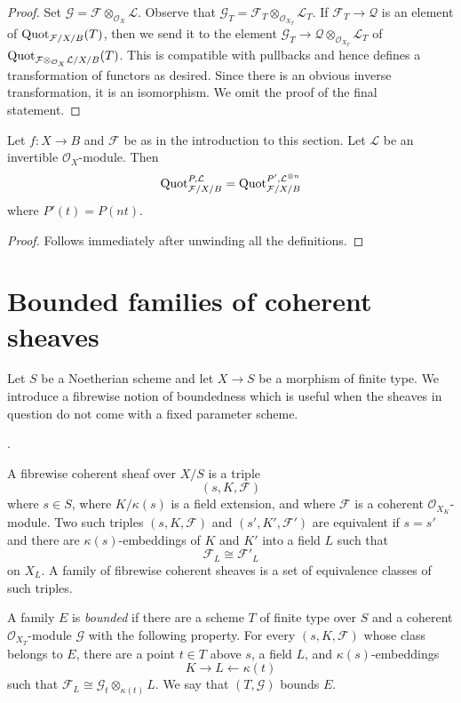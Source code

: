 \begin{proof}
Set $\mathcal{G} = \mathcal{F} \otimes_{\mathcal{O}_X} \mathcal{L}$.
Observe that
$\mathcal{G}_T = \mathcal{F}_T \otimes_{\mathcal{O}_{X_T}} \mathcal{L}_T$.
If $\mathcal{F}_T \to \mathcal{Q}$ is an element of
$\mathrm{Quot}_{\mathcal{F}/X/B}(T)$, then we send it
to the element
$\mathcal{G}_T \to \mathcal{Q} \otimes_{\mathcal{O}_{X_T}} \mathcal{L}_T$
of
$\mathrm{Quot}_{\mathcal{F} \otimes_{\mathcal{O}_X} \mathcal{L}/X/B}(T)$.
This is compatible with pullbacks and hence
defines a transformation of functors as desired.
Since there is an obvious inverse transformation,
it is an isomorphism. We omit the proof of the final statement.
\end{proof}

\begin{lemma}
\label{lemma-quot-power-invertible}
Let $f : X \to B$ and $\mathcal{F}$ be as in the introduction to this section.
Let $\mathcal{L}$ be an invertible $\mathcal{O}_X$-module.
Then
$$
\mathrm{Quot}^{P, \mathcal{L}}_{\mathcal{F}/X/B} =
\mathrm{Quot}^{P', \mathcal{L}^{\otimes n}}_{\mathcal{F}/X/B}
$$
where $P'(t) = P(nt)$.
\end{lemma}

\begin{proof}
Follows immediately after unwinding all the definitions.
\end{proof}


\section{Bounded families of coherent sheaves}
\label{section-bounded-coherent}

\noindent
Let $S$ be a Noetherian scheme and let $X \to S$ be a morphism of
finite type. We introduce a fibrewise notion of boundedness which is useful
when the sheaves in question do not come with a fixed parameter scheme.

\begin{definition}
\label{definition-bounded-coherent}
\begin{reference}
\cite[Expos\'e 221, D\'efinition 1.1, pp. 249--252]{FGA}.
\end{reference}
A fibrewise coherent sheaf over $X/S$ is a triple
$$
(s, K, \mathcal{F})
$$
where $s \in S$, where $K/\kappa(s)$ is a field extension, and where
$\mathcal{F}$ is a coherent $\mathcal{O}_{X_K}$-module. Two such triples
$(s, K, \mathcal{F})$ and $(s', K', \mathcal{F}')$ are equivalent if
$s=s'$ and there are $\kappa(s)$-embeddings of $K$ and $K'$ into a field
$L$ such that
$$
\mathcal{F}_L \cong \mathcal{F}'_L
$$
on $X_L$. A family of fibrewise coherent sheaves is a set of equivalence
classes of such triples.

A family $E$ is \emph{bounded} if there are a scheme $T$ of finite type
over $S$ and a coherent $\mathcal{O}_{X_T}$-module $\mathcal{G}$ with the
following property. For every $(s, K, \mathcal{F})$ whose class belongs to
$E$, there are a point $t \in T$ above $s$, a field $L$, and
$\kappa(s)$-embeddings
$$
K \longrightarrow L \longleftarrow \kappa(t)
$$
such that $\mathcal{F}_L \cong \mathcal{G}_t \otimes_{\kappa(t)} L$.
We say that $(T, \mathcal{G})$ bounds $E$.
\end{definition}

